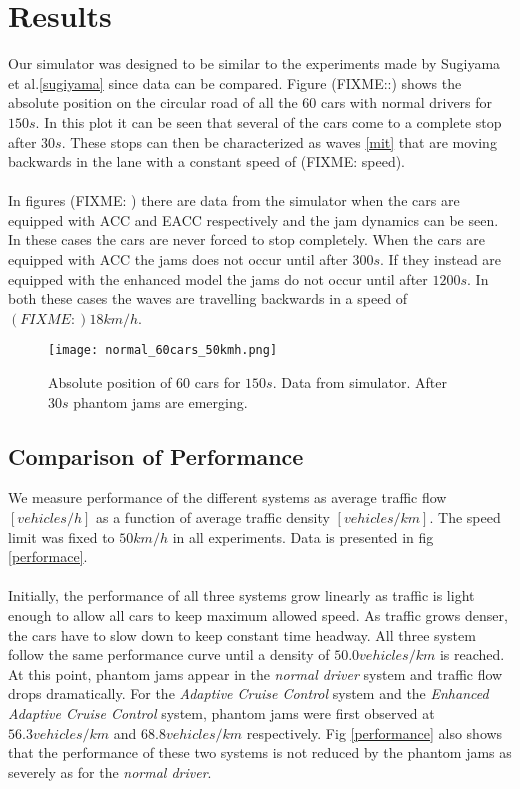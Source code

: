 \section{Results}
Our simulator was designed to be similar to the experiments made by Sugiyama et al.\ref{sugiyama} since data can be compared. Figure (FIXME::) shows the absolute position on the circular road of all the 60 cars with normal drivers for $ 150 \unit{s} $. In this plot it can be seen that several of the cars come to a complete stop after $ 30 \unit{s} $. These stops can then be characterized as waves \ref{mit} that are moving backwards in the lane with a constant speed of (FIXME: speed).\\\\

In figures (FIXME: ) there are data from the simulator when the cars are equipped with ACC and EACC respectively and the jam dynamics can be seen. In these cases the cars are never forced to stop completely. When the cars are equipped with ACC the jams does not occur until after $ 300 \unit{s} $. If they instead are equipped with the enhanced model the jams do not occur until after $ 1200 \unit{s} $. In both these cases the waves are travelling backwards in a speed of $ (FIXME:) 18 \unit{km/h} $.


\begin{figure}[h!]
    \begin{center}
    \texttt{[image: normal\_60cars\_50kmh.png]}
    \caption{\label{normal_postime}
Absolute position of 60 cars for $ 150 \unit{s} $. Data from simulator. After $ 30 \unit{s} $ phantom jams are emerging.}
    \end{center}
\end{figure}


\subsection{Comparison of Performance}
We measure performance of the different systems as average traffic flow
$ [\unit{vehicles/h}] $ as a function of average traffic density
$ [\unit{vehicles/km}] $. The speed limit was fixed to $ 50 \unit{km/h} $ in all
experiments. Data is presented in fig \ref{performace}.\\\\

Initially, the performance of all three systems grow linearly as traffic is
light enough to allow all cars to keep maximum allowed speed. As traffic grows
denser, the cars have to slow down to keep constant time headway. All three
system follow the same performance curve until a density of $ 50.0
\unit{vehicles/km} $ is reached. At this point, phantom jams appear in the
\emph{normal driver} system and traffic flow drops dramatically. For the
\emph{Adaptive Cruise Control} system and the \emph{Enhanced Adaptive Cruise
Control} system, phantom jams were first observed at $ 56.3 \unit{vehicles/km} $
and $ 68.8 \unit{vehicles/km} $ respectively. Fig \ref{performance} also shows
that the performance of these two systems is not reduced by the phantom jams
as severely as for the \emph{normal driver}.

